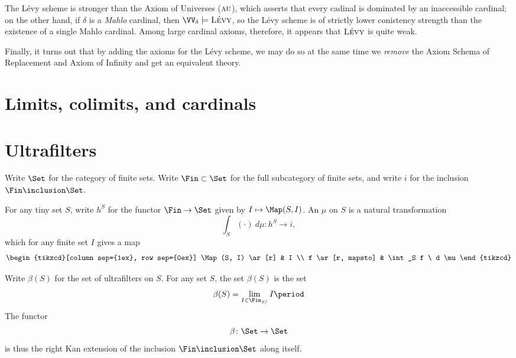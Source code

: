 The Lévy scheme is stronger than the Axiom of Universes ($\textsc{au}$), which asserts that every cadinal is dominated by an inaccessible cardinal;
on the other hand, if $\delta$ is a \emph{Mahlo} cardinal, then $\VV_{\delta}\models\textsc{Lévy}$, so the Lévy scheme is of strictly lower conistency strength than the existence of a single Mahlo cardinal. Among large cardinal axioms, therefore, it appears that $\textsc{Lévy}$ is quite weak.

Finally, it turns out that by adding the axioms for the Lévy scheme, we may do so at the same time we \emph{remove} the Axiom Schema of Replacement and Axiom of Infinity and get an equivalent theory.

\section{Limits, colimits, and cardinals}%
\label{sec:limits_colimits_and_cardinals}

\section{Ultrafilters}%
\label{sec:ultrafilters}

\begin{notation}
	Write $ \Set $ for the category of finite sets.
	Write $ \Fin \subset \Set $ for the full subcategory of finite sets,
	and write $ i $ for the inclusion $ \Fin \inclusion \Set $.
\end{notation}

\begin{definition}
	For any tiny set $ S $, write $ h^S $ for the functor $ \Fin \to \Set $ given by $ I  \mapsto \Map(S, I) $.
	An  $ \mu $ on $ S $ is a natural transformation
	\[
		\int_S (\cdot) \ d\mu \colon h^S \to i \comma
	\]
	which for any finite set $I$ gives a map
	\[
		\begin{tikzcd}[column sep={1ex}, row sep={0ex}]
			\Map(S, I) \ar[r] & I \\
			f \ar[r, mapsto] & \int_S f \ d \mu
		\end{tikzcd}
	\]

	Write $ \beta (S) $ for the set of ultrafilters on $ S $.
	For any set $ S $, the set $ \beta(S) $ is the set
	\[
		\beta(S) = \lim_{I \in \Fin_{S/}} I \period
	\]
	The functor
	\[
		\beta \colon \Set \to \Set
	\]
	is thus the right Kan extension of the inclusion $ \Fin \inclusion \Set $ along itself.
\end{definition}

